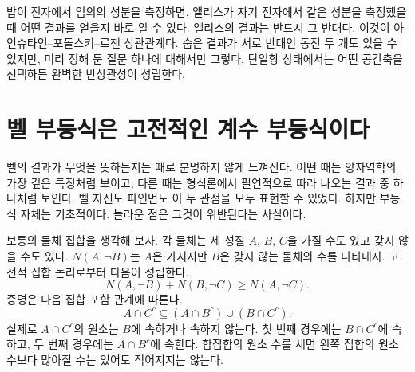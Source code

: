 \begin{classroomqa}
\end{classroomqa}

밥이 전자에서 임의의 성분을 측정하면, 앨리스가 자기 전자에서 같은 성분을 측정했을 때 어떤 결과를 얻을지 바로 알 수 있다. 앨리스의 결과는 반드시 그 반대다. 이것이 아인슈타인--포돌스키--로젠 상관관계다. 숨은 결과가 서로 반대인 동전 두 개도 있을 수 있지만, 미리 정해 둔 질문 하나에 대해서만 그렇다. 단일항 상태에서는 어떤 공간축을 선택하든 완벽한 반상관성이 성립한다.

\begin{classroomqa}
\end{classroomqa}

\begin{classroomqa}
\end{classroomqa}

\section{벨 부등식은 고전적인 계수 부등식이다}

벨의 결과가 무엇을 뜻하는지는 때로 분명하지 않게 느껴진다. 어떤 때는 양자역학의 가장 깊은 특징처럼 보이고, 다른 때는 형식론에서 필연적으로 따라 나오는 결과 중 하나처럼 보인다. 벨 자신도 파인먼도 이 두 관점을 모두 표현할 수 있었다. 하지만 부등식 자체는 기초적이다. 놀라운 점은 그것이 위반된다는 사실이다.

보통의 물체 집합을 생각해 보자. 각 물체는 세 성질 \(A\), \(B\), \(C\)을 가질 수도 있고 갖지 않을 수도 있다. \(N(A,\neg B)\)는 \(A\)은 가지지만 \(B\)은 갖지 않는 물체의 수를 나타내자. 고전적 집합 논리로부터 다음이 성립한다.
\begin{equation}
  N(A,\neg B)+N(B,\neg C)
  \geq
  N(A,\neg C).
  \label{eq:l05-bell-count}
\end{equation}
증명은 다음 집합 포함 관계에 따른다.
\begin{equation}
  A\cap C^{c}
  \subseteq
  (A\cap B^{c})\cup(B\cap C^{c}).
  \label{eq:l05-set-inclusion}
\end{equation}
실제로 \(A\cap C^c\)의 원소는 \(B\)에 속하거나 속하지 않는다. 첫 번째 경우에는 \(B\cap C^c\)에 속하고, 두 번째 경우에는 \(A\cap B^c\)에 속한다. 합집합의 원소 수를 세면 왼쪽 집합의 원소 수보다 많아질 수는 있어도 적어지지는 않는다.

